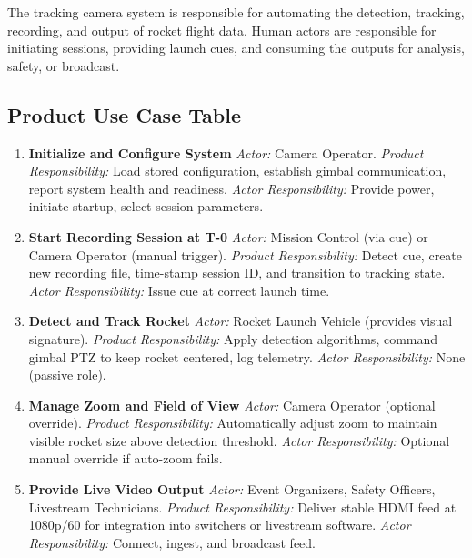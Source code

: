 \documentclass[12pt]{article}
\begin{document}
The tracking camera system is responsible for automating the detection,
tracking, recording, and output of rocket flight data. Human actors are
responsible for initiating sessions, providing launch cues, and consuming the
outputs for analysis, safety, or broadcast.

\subsection{Product Use Case Table}

\begin{enumerate}[wide=0pt, leftmargin=*]
  \item \textbf{Initialize and Configure System}
        \emph{Actor:} Camera Operator.
        \emph{Product Responsibility:} Load stored configuration, establish
        gimbal communication, report system health and readiness.
        \emph{Actor Responsibility:} Provide power, initiate startup, select
        session parameters.

  \item \textbf{Start Recording Session at T-0}
        \emph{Actor:} Mission Control (via cue) or Camera Operator (manual trigger).
        \emph{Product Responsibility:} Detect cue, create new recording file,
        time-stamp session ID, and transition to tracking state.
        \emph{Actor Responsibility:} Issue cue at correct launch time.

  \item \textbf{Detect and Track Rocket}
        \emph{Actor:} Rocket Launch Vehicle (provides visual signature).
        \emph{Product Responsibility:} Apply detection algorithms, command
        gimbal PTZ to keep rocket centered, log telemetry.
        \emph{Actor Responsibility:} None (passive role).

  \item \textbf{Manage Zoom and Field of View}
        \emph{Actor:} Camera Operator (optional override).
        \emph{Product Responsibility:} Automatically adjust zoom to maintain
        visible rocket size above detection threshold.
        \emph{Actor Responsibility:} Optional manual override if auto-zoom fails.

  \item \textbf{Provide Live Video Output}
        \emph{Actor:} Event Organizers, Safety Officers, Livestream Technicians.
        \emph{Product Responsibility:} Deliver stable HDMI feed at 1080p/60 for
        integration into switchers or livestream software.
        \emph{Actor Responsibility:} Connect, ingest, and broadcast feed.


\end{enumerate}
\end{document}
